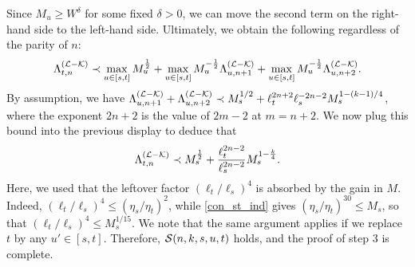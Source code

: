 %
Since $M_{u}\geq W^{\delta}$ for some fixed $\delta>0$, we can move the second term on the right-hand side to the left-hand side. Ultimately, we obtain the following regardless of the parity of $n$:
%
\begin{align*}
\Lambda^{({\cal L}-{\cal K})}_{t,n}\prec \max_{u\in[s,t]}M_{u}^{\frac12}+\max_{u\in[s,t]} M_{u}^{-\frac12}\Lambda^{({\cal L}-{\cal K})}_{u,n+1}+\max_{u\in[s,t]} M_{u}^{-\frac12}\Lambda^{({\cal L}-{\cal K})}_{u,n+2}.
\end{align*}
%
By assumption, we have $\Lambda^{({\cal L}-{\cal K})}_{u,n+1}+\Lambda^{({\cal L}-{\cal K})}_{u,n+2}\prec M_{s}^{1/2}+\ell_{t}^{2n+2}\ell_{s}^{-2n-2}M_{s}^{1-(k-1)/4}$, where the exponent $2n+2$ is the value of $2m-2$ at $m=n+2$. We now plug this bound into the previous display to deduce that 
%
\begin{align*}
\Lambda^{({\cal L}-{\cal K})}_{t,n}\prec M_{s}^{\frac12}+\frac{\ell_{t}^{2n-2}}{\ell_{s}^{2n-2}}M_{s}^{1-\frac{k}{4}}.
\end{align*}
%
Here, we used that the leftover factor $(\ell_{t}/\ell_{s})^{4}$ is absorbed by the gain in $M$. Indeed, $(\ell_{t}/\ell_{s})^{4}\leq(\eta_{s}/\eta_{t})^{2}$, while \eqref{con_st_ind} gives $(\eta_{s}/\eta_{t})^{30}\leq M_{s}$, so that $(\ell_{t}/\ell_{s})^{4}\leq M_{s}^{1/15}$.
We note that the same argument applies if we replace $t$ by any $u'\in[s,t]$. Therefore, ${\cal S}(n,k,s,u,t)$ holds, and the proof of step 3 is complete.


